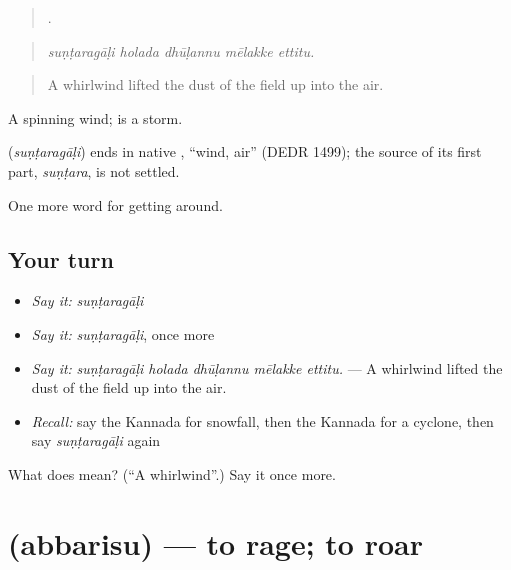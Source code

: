 \begin{quote}
    .
\end{quote}

\begin{quote}
\emph{suṇṭaragāḷi holada dhūḷannu mēlakke ettitu.}
\end{quote}

\begin{quote}
A whirlwind lifted the dust of the field up into the air.
\end{quote}

A spinning wind;  is a storm.

\begin{cousinweb}
\textbf{} (\emph{suṇṭaragāḷi}) ends in native , \textquotedblleft{}wind, air\textquotedblright{} (DEDR 1499); the source of its first part, \emph{suṇṭara}, is not settled.
\end{cousinweb}

\begin{grammarlens}[title={What you've built}]
One more word for getting around.
\end{grammarlens}

\subsection*{Your turn}
\begin{itemize}
\raggedright
  \item \emph{Say it:} \emph{suṇṭaragāḷi}
  \item \emph{Say it:} \emph{suṇṭaragāḷi}, once more
  \item \emph{Say it:} \emph{suṇṭaragāḷi holada dhūḷannu mēlakke ettitu.} — A whirlwind lifted the dust of the field up into the air.
  \item \emph{Recall:} say the Kannada for snowfall, then the Kannada for a cyclone, then say \emph{suṇṭaragāḷi} again
\end{itemize}

\begin{tcolorbox}[breakable,colback=teal!4,colframe=teal!35!black,title={Before you move on}]
What does  mean? (\textquotedblleft{}A whirlwind\textquotedblright{}.) Say it once more.
\end{tcolorbox}
\section[\texorpdfstring{\kn{ಅಬ್ಬರಿಸು} (abbarisu)}{ಅಬ್ಬರಿಸು (abbarisu)}]{ (abbarisu) — to rage; to roar}

